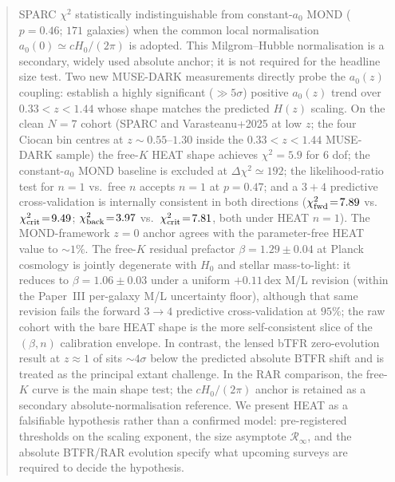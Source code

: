 \documentclass[twocolumn,letterpaper]{aastex631}
\newcommand{\azero}{a_0}
\begin{document}
\begin{abstract}
SPARC $\chi^{2}$ statistically indistinguishable from
constant-$\azero$ MOND ($p=0.46$; $171$ galaxies) when the common
local normalisation $\azero(0)\simeq cH_0/(2\pi)$ is adopted.
This Milgrom--Hubble normalisation is a secondary, widely used
absolute anchor; it is not required for the headline size test.
Two new MUSE-DARK measurements directly probe the
$\azero(z)$ coupling: \citet{Ciocan2026RAR,Ciocan2026Halo}
establish a highly significant ($\gg 5\sigma$) positive
$\azero(z)$ trend over $0.33\!<\!z\!<\!1.44$ whose shape matches
the predicted $H(z)$ scaling.  On the clean $N\!=\!7$ cohort
(SPARC and Varasteanu+2025 at low $z$; the four Ciocan bin
centres at $z\!\sim\!0.55$--$1.30$ inside the
$0.33\!<\!z\!<\!1.44$ MUSE-DARK sample) the free-$K$ HEAT
shape achieves
$\chi^{2}\!=\!5.9$ for $6$ dof; the constant-$\azero$ MOND
baseline is excluded at $\Delta\chi^{2}\!\simeq\!192$; the
likelihood-ratio test for $n\!=\!1$ vs.\ free $n$ accepts
$n\!=\!1$ at $p\!=\!0.47$; and a $3\!+\!4$ predictive
cross-validation is internally consistent in both directions
($\chi^{2}_{\rm fwd}\!=\!7.89$ vs.\ $\chi^{2}_{\rm crit}\!=\!9.49$;
$\chi^{2}_{\rm back}\!=\!3.97$ vs.\ $\chi^{2}_{\rm crit}\!=\!7.81$,
both under HEAT $n\!=\!1$).  The MOND-framework $z\!=\!0$
anchor agrees with the parameter-free HEAT value to $\sim 1\%$.
The free-$K$ residual prefactor $\beta\!=\!1.29\!\pm\!0.04$ at
Planck cosmology is jointly degenerate with $H_{0}$ and stellar
mass-to-light: it reduces to $\beta\!=\!1.06\!\pm\!0.03$ under a
uniform $+0.11$\,dex M/L revision (within the Paper~III
per-galaxy M/L uncertainty floor), although that same revision
fails the forward $3\!\to\!4$ predictive cross-validation at
$95\%$; the raw cohort with the bare HEAT shape is the more
self-consistent slice of the $(\beta,n)$ calibration envelope.  In contrast, the
lensed bTFR zero-evolution result at $z\!\approx\!1$ of
\citet{Jeanneau2026} sits $\sim 4\sigma$ below the predicted
absolute BTFR shift and is treated as the principal extant
challenge.  In the RAR comparison, the free-$K$
curve is the main shape test; the $cH_0/(2\pi)$ anchor is retained
as a secondary absolute-normalisation reference.  We present HEAT
as a falsifiable hypothesis rather than a confirmed model:
pre-registered
thresholds on the scaling exponent, the size asymptote
$\mathcal{R}_{\infty}$, and the absolute BTFR/RAR evolution
specify what upcoming surveys are required to decide the
hypothesis.
\end{abstract}

\end{document}
